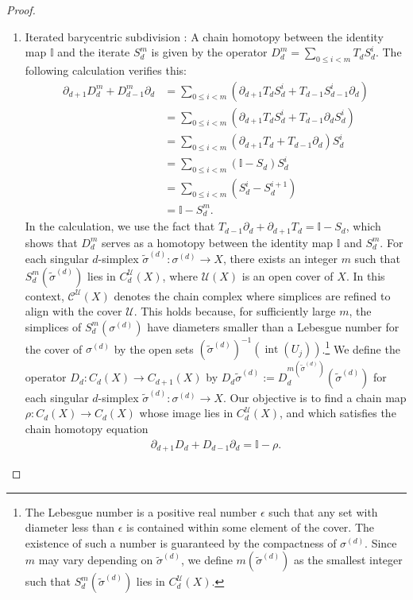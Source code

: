 \begin{proof}{\textit{\cite[Proof of Proposition 2.21]{hatcher2005algebraic}}}
\begin{enumerate}
	\item Iterated barycentric subdivision \cite[Proposition 2.21 (4)]{hatcher2005algebraic}: A chain homotopy between the identity map \( \mathbb{I} \) and the iterate \( S^m_d \) is given by the operator $D^m_d = \sum_{0 \leq i < m} T_d S_d^i$. The following calculation verifies this:
	\begin{align}
		\partial_{d+1} D^m_d + D^m_{d-1} \partial_{d} & = \sum_{0 \leq i < m} (\partial_{d+1} T_d S_d^i + T_{d-1} S_{d-1}^i \partial_{d}) \nonumber\\
		&= \sum_{0 \leq i < m} (\partial_{d+1} T_d S_d^i + T_{d-1} \partial_{d} S_{d}^i) \nonumber\\
		& = \sum_{0 \leq i < m} (\partial_{d+1} T_d + T_{d-1} \partial_d) S_{d}^i \nonumber\\
		&= \sum_{0 \leq i < m} (\mathbb{I} - S_{d}) S_{d}^i \nonumber\\
		& = \sum_{0 \leq i < m} (S_{d}^i - S_{d}^{i+1}) \nonumber\\
		&= \mathbb{I} - S^m_{d}.                                                       
	\end{align}
	In the calculation, we use the fact that \( T_{d-1}\partial_{d} + \partial_{d+1} T_{d} = \mathbb{I} - S_{d} \), which shows that \( D^m_d \) serves as a homotopy between the identity map \( \mathbb{I} \) and \( S^m_d \). For each singular \( d \)-simplex \( \tilde{\sigma}^{(d)} : \sigma^{(d)} \to X \), there exists an integer \( m \) such that \( S^m_d(\tilde{\sigma}^{(d)}) \) lies in \( C_d^{\mathcal{U}}(X) \), where \( \mathcal{U}(X) \) is an open cover of \( X \). In this context, \( \mathcal{C}^{\mathcal{U}}(X) \) denotes the chain complex where simplices are refined to align with the cover \( \mathcal{U} \). This holds because, for sufficiently large \( m \), the simplices of \( S^m_d(\sigma^{(d)}) \) have diameters smaller than a Lebesgue number for the cover of \( \sigma^{(d)} \) by the open sets \( (\tilde{\sigma}^{(d)})^{-1}(\operatorname{int}(U_j)) \).\footnote{The Lebesgue number is a positive real number \( \epsilon \) such that any set with diameter less than \( \epsilon \) is contained within some element of the cover. The existence of such a number is guaranteed by the compactness of \( \sigma^{(d)} \). Since \( m \) may vary depending on \( \tilde{\sigma}^{(d)} \), we define \( m(\tilde{\sigma}^{(d)}) \) as the smallest integer such that \( S_d^m(\tilde{\sigma}^{(d)}) \) lies in \( C_d^{\mathcal{U}}(X) \).} We define the operator \( D_d : C_d(X) \to C_{d+1}(X) \) by \( D_d\tilde{\sigma}^{(d)} := D_d^{m(\tilde{\sigma}^{(d)})}(\tilde{\sigma}^{(d)}) \) for each singular \( d \)-simplex \( \tilde{\sigma}^{(d)} : \sigma^{(d)} \to X \). Our objective is to find a chain map \( \rho : C_d(X) \to C_d(X) \) whose image lies in \( C_d^{\mathcal{U}}(X) \), and which satisfies the chain homotopy equation
	\begin{align}
		\partial_{d+1} D_{d} + D_{d-1} \partial_{d}= \mathbb{I} - \rho. 
	\end{align}
		

\end{enumerate}
\end{proof}
